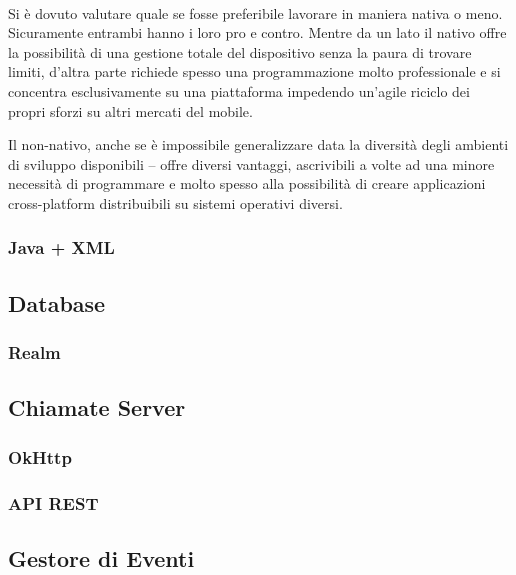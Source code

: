 \paragraph{}
Si è dovuto valutare quale se fosse preferibile lavorare in maniera nativa o meno.
Sicuramente entrambi hanno i loro pro e contro. Mentre da un lato il nativo offre la possibilità di una gestione totale del dispositivo senza la paura di trovare limiti, d’altra parte richiede spesso una programmazione molto professionale e si concentra esclusivamente su una piattaforma impedendo un’agile riciclo dei propri sforzi su altri mercati del mobile. \autocite{HTMLIT:PROG_NATIVA} 


Il non-nativo, anche se è impossibile generalizzare data la diversità degli ambienti di sviluppo disponibili – offre diversi vantaggi, ascrivibili a volte ad una minore necessità di programmare e molto spesso alla possibilità di creare applicazioni cross-platform distribuibili su sistemi operativi diversi.

\subsubsection{Java + XML}

\subsection{Database}

\subsubsection{Realm}

\subsection{Chiamate Server}

\subsubsection{OkHttp}

\subsubsection{API REST}

\subsection{Gestore di Eventi}

